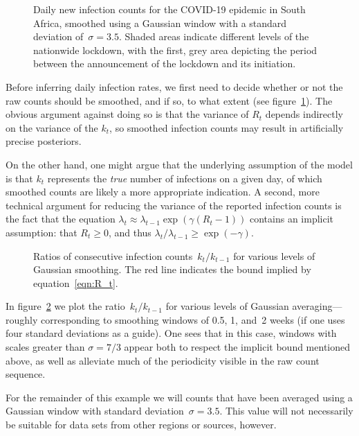 \documentclass[12pt,a4paper]{article}
\begin{document}
\begin{figure}[htb]
  \centering
  \caption{Daily new infection counts for the COVID-19 epidemic in South Africa,
    smoothed using a Gaussian window with a standard deviation of~$\sigma =
    3.5$. Shaded areas indicate different levels of the nationwide lockdown,
    with the first, grey area depicting the period between the announcement of
    the lockdown and its initiation.}
  \label{fig:counts}
\end{figure}

Before inferring daily infection rates, we first need to decide whether or not
the raw counts should be smoothed, and if so, to what extent (see
figure~\ref{fig:counts}). The obvious argument against doing so is that the
variance of $R_t$ depends indirectly on the variance of the $k_t$, so smoothed
infection counts may result in artificially precise posteriors.

On the other hand, one might argue that the underlying assumption of the model
is that $k_t$ represents the \emph{true} number of infections on a given day, of
which smoothed counts are likely a more appropriate indication. A second, more
technical argument for reducing the variance of the reported infection counts is
the fact that the equation $\lambda_t \approx \lambda_{t-1}\exp(\gamma(R_t -
1))$ contains an implicit assumption: that $R_t \ge 0$, and thus
$\lambda_t/\lambda_{t-1} \ge \exp(-\gamma)$.

\begin{figure}[htb]
  \centering
  \caption{Ratios of consecutive infection counts~$k_t/k_{t-1}$ for various
    levels of Gaussian smoothing. The red line indicates the bound implied by
    equation~\eqref{eqn:R_t}.}
  \label{fig:ratio}
\end{figure}

In figure~\ref{fig:ratio} we plot the ratio~$k_t/k_{t-1}$ for various levels of
Gaussian averaging---roughly corresponding to smoothing windows of 0.5, 1, and~2
weeks (if one uses four standard deviations as a guide). One sees that in this
case, windows with scales greater than $\sigma = 7/3$ appear both to respect the
implicit bound mentioned above, as well as alleviate much of the periodicity
visible in the raw count sequence.

For the remainder of this example we will counts that have been averaged using a
Gaussian window with standard deviation~$\sigma = 3.5$. This value will not
necessarily be suitable for data sets from other regions or sources, however.
\end{document}
